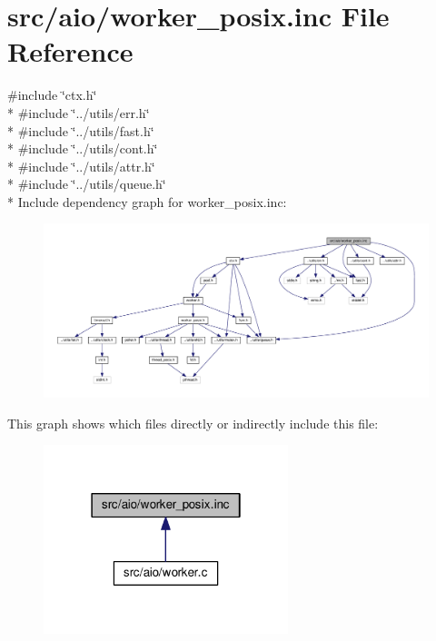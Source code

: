 \hypertarget{worker__posix_8inc}{}\section{src/aio/worker\+\_\+posix.inc File Reference}
\label{worker__posix_8inc}
{\ttfamily \#include \char`\"{}ctx.\+h\char`\"{}}\\*
{\ttfamily \#include \char`\"{}../utils/err.\+h\char`\"{}}\\*
{\ttfamily \#include \char`\"{}../utils/fast.\+h\char`\"{}}\\*
{\ttfamily \#include \char`\"{}../utils/cont.\+h\char`\"{}}\\*
{\ttfamily \#include \char`\"{}../utils/attr.\+h\char`\"{}}\\*
{\ttfamily \#include \char`\"{}../utils/queue.\+h\char`\"{}}\\*
Include dependency graph for worker\+\_\+posix.\+inc\+:\nopagebreak
\begin{figure}[H]
\begin{center}
\leavevmode
\includegraphics[width=350pt]{worker__posix_8inc__incl}
\end{center}
\end{figure}
This graph shows which files directly or indirectly include this file\+:\nopagebreak
\begin{figure}[H]
\begin{center}
\leavevmode
\includegraphics[width=202pt]{worker__posix_8inc__dep__incl}
\end{center}
\end{figure}
